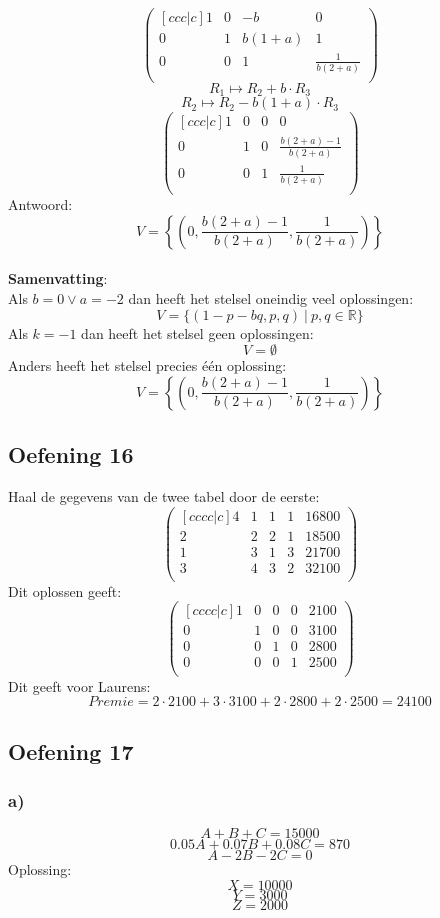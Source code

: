 \documentclass[lineaire_algebra_oplossingen.tex]{subfiles}
\begin{document}
\[
\begin{pmatrix}[ccc|c]
1 & 0 & -b & 0\\
0 & 1 & b(1+a) & 1\\
0 & 0 & 1 & \frac{1}{b(2+a)}\\
\end{pmatrix}
\]
\[ R_1 \longmapsto R_2 + b\cdot R_3 \]
\[ R_2 \longmapsto R_2 - b(1+a)\cdot R_3 \]
\[
\begin{pmatrix}[ccc|c]
1 & 0 & 0 & 0\\
0 & 1 & 0 & \frac{b(2+a)-1}{b(2+a)}\\
0 & 0 & 1 & \frac{1}{b(2+a)}\\
\end{pmatrix}
\]
Antwoord:
\[
V=\left\lbrace\left(0,\frac{b(2+a)-1}{b(2+a)}, \frac{1}{b(2+a)}\right)\right\rbrace
\]\\
\textbf{Samenvatting}:\\
Als  $b=0 \vee a=-2$ dan heeft het stelsel oneindig veel oplossingen:
\[
V = \{ (1-p-bq,p,q)\ |\ p,q \in \mathbb{R} \}
\]
Als $k=-1$ dan heeft het stelsel geen oplossingen:
\[
V=\emptyset
\]
Anders heeft het stelsel precies \'e\'en oplossing:
\[
V=\left\lbrace\left(0,\frac{b(2+a)-1}{b(2+a)}, \frac{1}{b(2+a)}\right)\right\rbrace
\]
\subsection{Oefening 16}
Haal de gegevens van de twee tabel door de eerste:
\[
\begin{pmatrix}[cccc|c]
4 & 1 & 1 & 1 & 16800\\
2 & 2 & 2 & 1 & 18500\\
1 & 3 & 1 & 3 & 21700\\
3 & 4 & 3 & 2 & 32100\\
\end{pmatrix}
\]
Dit oplossen geeft:
\[
\begin{pmatrix}[cccc|c]
1 & 0 & 0 & 0 & 2100\\
0 & 1 & 0 & 0 & 3100\\
0 & 0 & 1 & 0 & 2800\\
0 & 0 & 0 & 1 & 2500\\
\end{pmatrix}
\]
Dit geeft voor Laurens:
\[
\textit{Premie} = 2\cdot 2100 + 3\cdot 3100 + 2\cdot 2800 + 2\cdot 2500 = 24100
\]
\subsection{Oefening 17}
\subsubsection*{a)}
\[A + B + C = 15000\]
\[0.05A + 0.07B + 0.08C = 870\]
\[A-2B-2C=0\]
Oplossing:
\[X = 10000\]
\[Y = 3000\]
\[Z = 2000\]
\end{document}
